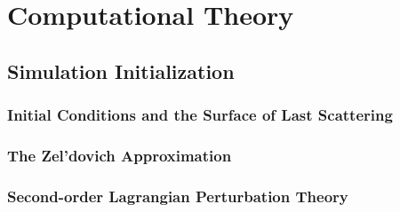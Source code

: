 
%
%

\section{Computational Theory}
\label{sec:computational_theory}





\subsection{Simulation Initialization}
\label{subsec:computational_theory--simulation_initialization}



\subsubsection{Initial Conditions and the Surface of Last Scattering}
\label{subsubsec:computational_theory--simulation_initialization--initial_conditions}



\subsubsection{The Zel'dovich Approximation}
\label{subsubsec:computational_theory--simulation_initialization--za_theory}



\subsubsection{Second-order Lagrangian Perturbation Theory}
\label{subsubsec:computational_theory--simulation_initialization--2lpt_theory}




